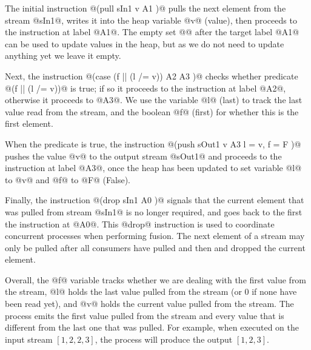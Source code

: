 The initial instruction @(pull sIn1 v A1 {})@ pulls the next element from the stream @sIn1@, writes it into the heap variable @v@ (value), then proceeds to the instruction at label @A1@. The empty set @{}@ after the target label @A1@ can be used to update values in the heap, but as we do not need to update anything yet we leave it empty. 

Next, the instruction @(case (f || (l /= v)) A2 {} A3 {})@ checks whether predicate @(f || (l /= v))@ is true; if so it proceeds to the instruction at label @A2@, otherwise it proceeds to @A3@. We use the variable @l@ (last) to track the last value read from the stream, and the boolean @f@ (first) for whether this is the first element.

When the predicate is true, the instruction @(push sOut1 v A3 { l = v, f = F })@ pushes the value @v@ to the output stream @sOut1@ and proceeds to the instruction at label @A3@, once the heap has been updated to set variable @l@ to @v@ and @f@ to @F@ (False). 

Finally, the instruction @(drop sIn1 A0 {})@ signals that the current element that was pulled from stream @sIn1@ is no longer required, and goes back to the first the instruction at @A0@. This @drop@ instruction is used to coordinate concurrent processes when performing fusion. The next element of a stream may only be pulled after all consumers have pulled and then and dropped the current element.

Overall, the @f@ variable tracks whether we are dealing with the first value from the stream, @l@ holds the last value pulled from the stream (or 0 if none have been read yet), and @v@ holds the current value pulled from the stream. The process emits the first value pulled from the stream and every value that is different from the last one that was pulled. For example, when executed on the input stream $[1, 2, 2, 3]$, the process will produce the output $[1, 2, 3]$.

